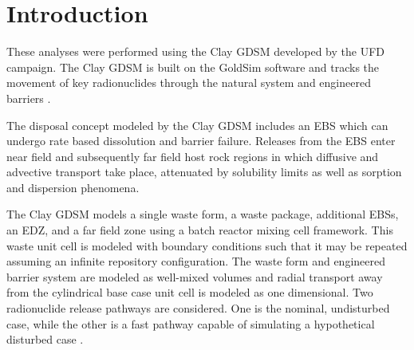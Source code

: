 
\section{Introduction}

These analyses were performed using the Clay \gls{GDSM} developed by the 
\gls{UFD} campaign\cite{clayton_generic_2011}. The Clay \gls{GDSM} is built on the 
GoldSim software and tracks the movement of key radionuclides through the 
natural system and engineered barriers \cite{golder_goldsim_2010, 
golder_goldsim_ct_2010}.

The disposal concept modeled by the Clay \gls{GDSM} includes an \gls{EBS} which 
can undergo rate based dissolution and barrier failure. Releases from the \gls{EBS} enter 
near field and subsequently far field host rock regions in which diffusive and 
advective transport take place, attenuated by solubility limits as well as 
sorption and dispersion phenomena.  

The Clay \gls{GDSM} models a single waste form, a waste package, additional 
\glspl{EBS}, 
an \gls{EDZ}, and a far field zone using a batch reactor mixing cell framework. This waste unit cell is modeled 
with boundary conditions such that it may be repeated assuming an infinite 
repository configuration. The waste form and engineered barrier system are modeled as well-mixed volumes 
and radial transport away from the cylindrical base case unit cell is modeled as  
one dimensional. Two radionuclide release pathways are considered. One is the nominal, 
undisturbed case, while the other is a fast pathway capable of simulating a 
hypothetical disturbed case 
\cite{clayton_generic_2011}.

